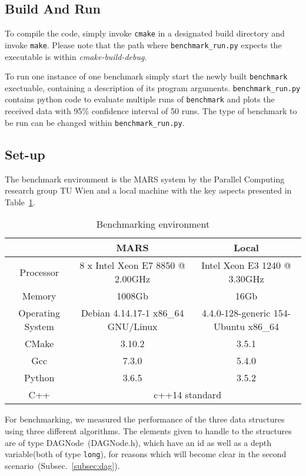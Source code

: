 \documentclass [10pt]{scrartcl}
\begin{document}
   
   \subsection{Build And Run}
   To compile the code, simply invoke \texttt{cmake} in a designated build directory and invoke \texttt{make}. Please note that the path where \texttt{benchmark\_run.py} expects the executable is within \textit{cmake-build-debug}.
   
   To run one instance of one benchmark simply start the newly built \texttt{benchmark} exectuable, containing a description of its program arguments. \texttt{benchmark\_run.py} contains python code to evaluate multiple runs of \texttt{benchmark} and plots the received data with 95\% confidence interval of 50 runs. The type of benchmark to be run can be changed within \texttt{benchmark\_run.py}.
   
   \subsection{Set-up}
   The benchmark environment is the MARS system by the Parallel Computing research group TU Wien and a local machine with the key aspects presented in Table~\ref{tab:environment}. 
   
   \begin{table}[h]
      \centering
      \begin{tabular}{c||c|c}
         \hline
         & MARS & Local \\ \hline
         Processor & 8 x Intel Xeon E7 8850 @ 2.00GHz & Intel Xeon E3 1240 @ 3.30GHz \\ \hline
         Memory & 1008Gb & 16Gb\\ \hline
         Operating System & Debian 4.14.17-1 x86\_64 GNU/Linux & 4.4.0-128-generic 154-Ubuntu x86\_64 \\ \hline
         CMake & 3.10.2 & 3.5.1\\ \hline 
         Gcc & 7.3.0  & 5.4.0 \\ \hline
         Python & 3.6.5 & 3.5.2\\ \hline
         C++ & \multicolumn{2}{c}{c++14 standard}    \\ \hline
      \end{tabular}
      \caption{Benchmarking environment}
      \label{tab:environment}
   \end{table}
   
   
   For benchmarking, we measured the performance of the three data structures using three different algorithms. The elements given to handle to the structures are of type DAGNode~(DAGNode.h),
   which have an id as well as a depth variable(both of type \texttt{long}), for reasons which will become clear in the second scenario~(Subsec.~\ref{subsec:dag}).
   
\end{document}

